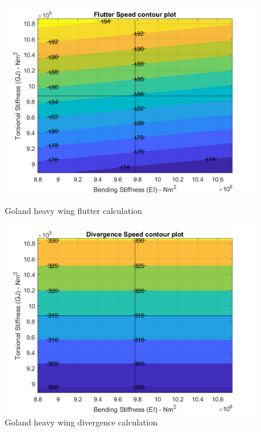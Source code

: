 \documentclass[11pt]{article}
\begin{document}
\begin{figure}[!hbt]
    \begin{minipage}{.5\textwidth}
    \centering
    \includegraphics[width = \textwidth]{figures/Goland_flutter.png}
    \caption{Goland heavy wing flutter calculation}
    \label{fig:Goland-flutter}
    \end{minipage}%
    \begin{minipage}{.5\textwidth}
    \centering
    \includegraphics[width = \textwidth]{figures/Goland_divergence.png}
    \caption{Goland heavy wing divergence calculation}
    \label{fig:Goland-div}
    \end{minipage}
\end{figure}
\end{document}
